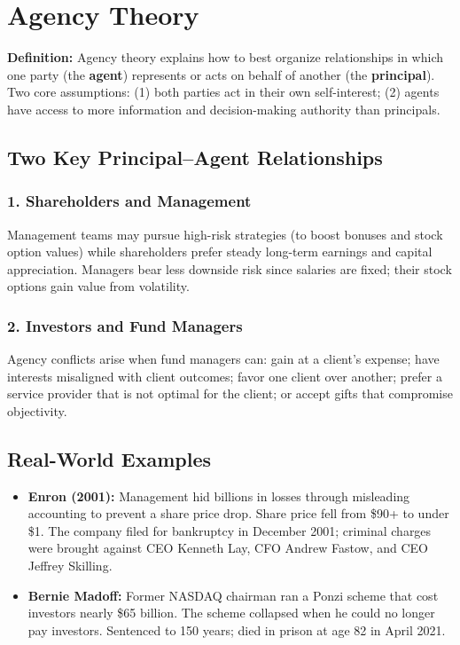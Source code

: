 \documentclass[11pt, letterpaper]{article}
\begin{document}
\newpage

\section{Agency Theory}

\begin{defbox}
\textbf{Definition:} Agency theory explains how to best organize relationships in which one party (the \textbf{agent}) represents or acts on behalf of another (the \textbf{principal}). Two core assumptions: (1) both parties act in their own self-interest; (2) agents have access to more information and decision-making authority than principals.
\end{defbox}

\subsection{Two Key Principal--Agent Relationships}

\subsubsection{1. Shareholders and Management}
Management teams may pursue high-risk strategies (to boost bonuses and stock option values) while shareholders prefer steady long-term earnings and capital appreciation. Managers bear less downside risk since salaries are fixed; their stock options gain value from volatility.

\subsubsection{2. Investors and Fund Managers}
Agency conflicts arise when fund managers can: gain at a client's expense; have interests misaligned with client outcomes; favor one client over another; prefer a service provider that is not optimal for the client; or accept gifts that compromise objectivity.

\subsection{Real-World Examples}

\begin{itemize}[leftmargin=*]
  \item \textbf{Enron (2001):} Management hid billions in losses through misleading accounting to prevent a share price drop. Share price fell from \$90+ to under \$1. The company filed for bankruptcy in December 2001; criminal charges were brought against CEO Kenneth Lay, CFO Andrew Fastow, and CEO Jeffrey Skilling.
  \item \textbf{Bernie Madoff:} Former NASDAQ chairman ran a Ponzi scheme that cost investors nearly \$65 billion. The scheme collapsed when he could no longer pay investors. Sentenced to 150 years; died in prison at age 82 in April 2021.
\end{itemize}
\end{document}
